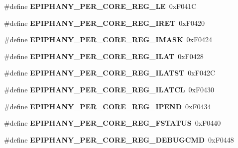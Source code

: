 \begin{DoxyCompactItemize}
\#define {\bfseries E\+P\+I\+P\+H\+A\+N\+Y\+\_\+\+P\+E\+R\+\_\+\+C\+O\+R\+E\+\_\+\+R\+E\+G\+\_\+\+LE}~0x\+F041C
\item 
\mbox{\label{epiphany-utility_8h_a74bbff55883a3c5a524fc4f4e6c4fe45}} 
\#define {\bfseries E\+P\+I\+P\+H\+A\+N\+Y\+\_\+\+P\+E\+R\+\_\+\+C\+O\+R\+E\+\_\+\+R\+E\+G\+\_\+\+I\+R\+ET}~0x\+F0420
\item 
\mbox{\label{epiphany-utility_8h_a2e3c6d271ca72b1ec414a856fba126cc}} 
\#define {\bfseries E\+P\+I\+P\+H\+A\+N\+Y\+\_\+\+P\+E\+R\+\_\+\+C\+O\+R\+E\+\_\+\+R\+E\+G\+\_\+\+I\+M\+A\+SK}~0x\+F0424
\item 
\mbox{\label{epiphany-utility_8h_ad2276587bd9f3cf9c65fa5b7cc8a09cb}} 
\#define {\bfseries E\+P\+I\+P\+H\+A\+N\+Y\+\_\+\+P\+E\+R\+\_\+\+C\+O\+R\+E\+\_\+\+R\+E\+G\+\_\+\+I\+L\+AT}~0x\+F0428
\item 
\mbox{\label{epiphany-utility_8h_aebef3f9149fd2ba8b500e1efeaf6c6df}} 
\#define {\bfseries E\+P\+I\+P\+H\+A\+N\+Y\+\_\+\+P\+E\+R\+\_\+\+C\+O\+R\+E\+\_\+\+R\+E\+G\+\_\+\+I\+L\+A\+T\+ST}~0x\+F042C
\item 
\mbox{\label{epiphany-utility_8h_ac7920bb0dbebb749ade78875373b5313}} 
\#define {\bfseries E\+P\+I\+P\+H\+A\+N\+Y\+\_\+\+P\+E\+R\+\_\+\+C\+O\+R\+E\+\_\+\+R\+E\+G\+\_\+\+I\+L\+A\+T\+CL}~0x\+F0430
\item 
\mbox{\label{epiphany-utility_8h_af75a81e77dfc5674e846e264a30a3954}} 
\#define {\bfseries E\+P\+I\+P\+H\+A\+N\+Y\+\_\+\+P\+E\+R\+\_\+\+C\+O\+R\+E\+\_\+\+R\+E\+G\+\_\+\+I\+P\+E\+ND}~0x\+F0434
\item 
\mbox{\label{epiphany-utility_8h_a8c20fc0e098836eb2f27e65ef2ab2686}} 
\#define {\bfseries E\+P\+I\+P\+H\+A\+N\+Y\+\_\+\+P\+E\+R\+\_\+\+C\+O\+R\+E\+\_\+\+R\+E\+G\+\_\+\+F\+S\+T\+A\+T\+US}~0x\+F0440
\item 
\mbox{\label{epiphany-utility_8h_abdac599c26e7c9a527e5c343af22762b}} 
\#define {\bfseries E\+P\+I\+P\+H\+A\+N\+Y\+\_\+\+P\+E\+R\+\_\+\+C\+O\+R\+E\+\_\+\+R\+E\+G\+\_\+\+D\+E\+B\+U\+G\+C\+MD}~0x\+F0448
\item 

\end{DoxyCompactItemize}
